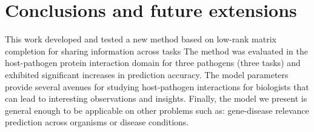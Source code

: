 \documentclass[runningheads,a4paper]{llncs}
\begin{document}




\section{Conclusions and future extensions}
This work developed and tested a new method based on low-rank matrix completion for sharing information across tasks
The method was evaluated in the host-pathogen protein interaction domain for three pathogens (three tasks) and exhibited significant increases in prediction accuracy. The model parameters provide several avenues for
studying host-pathogen interactions for biologists that can lead to interesting observations and insights. Finally, the model we present is general enough to be applicable on other problems such as: gene-disease relevance prediction across organisms or disease conditions. 
\end{document}
